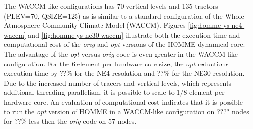 The WACCM-like configurations has 70 vertical levels and 135 tractors (PLEV=70, QSIZE=125) as is similar to a standard configuration of the Whole Atmosphere Community Climate Model (WACCM).  Figures \ref{fig:homme-ys-ne4-waccm} and \ref{fig:homme-ys-ne30-waccm} illustrate both the execution time and computational cost of the {\em orig} and {\em opt} versions of the HOMME dynamical core.  The advantage of the {\em opt} versus {\em orig} code is even greater in the WACCM-like configuration.  For the 6 element per hardware core size, the {\em opt} reductions execution time by {\color{red} ??\%} for the NE4 resolution and {\color{red} ??\%} for the NE30 resolution. Due to the increased number of tracers and vertical levels, which represents additional threading parallelism, it is possible to scale to $1/8$ element per hardware core.  An evaluation of computational cost indicates that it is possible to run the {\em opt} version of HOMME in a WACCM-like configuration on {\color{red}????} nodes for {\color{red} ??\%} less then the {\em orig} code on 57 nodes.  

